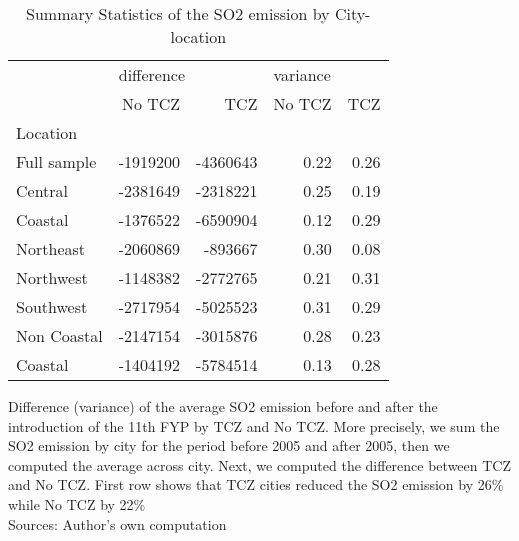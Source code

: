 \documentclass[12pt]{article}
\begin{document}
\begin{table}[!htbp]
\begin{threeparttable}
\end{threeparttable}
\end{table} 

\hfill \break

\begin{table}[!htbp] \centering 
    \begin{threeparttable} 
    \caption{\small Summary Statistics of the SO2 emission by City-location}
        \begin{tabular}{lrrrr}
        \toprule
            {} & \multicolumn{2}{l}{difference} & \multicolumn{2}{l}{variance} \\
             &      No TCZ &         TCZ &   No TCZ &  TCZ \\
            Location    &             &             &          &      \\
            \midrule
            Full sample & -1919200 & -4360643 &     0.22 & 0.26 \\
            Central     & -2381649 & -2318221 &     0.25 & 0.19 \\
            Coastal     & -1376522 & -6590904 &     0.12 & 0.29 \\
            Northeast   & -2060869 &  -893667 &     0.30 & 0.08 \\
            Northwest   & -1148382 & -2772765 &     0.21 & 0.31 \\
            Southwest   & -2717954 & -5025523 &     0.31 & 0.29 \\
            Non Coastal & -2147154 & -3015876 &     0.28 & 0.23 \\
            Coastal     & -1404192 & -5784514 &     0.13 & 0.28 \\
        \bottomrule
        \end{tabular}
        \begin{tablenotes}
                \small
            \item Difference (variance) of the average SO2 emission before and after the introduction of the 11th FYP by TCZ and No TCZ. More precisely, we sum the SO2 emission by city for the period before 2005 and after 2005, then we computed the average across city. Next, we computed the difference between TCZ and No TCZ. First row shows that TCZ cities reduced the SO2 emission by 26\% while No TCZ by 22\% \\
            Sources: Author's own computation 
        \end{tablenotes}
    \end{threeparttable}
\end{table} 
\end{document}
